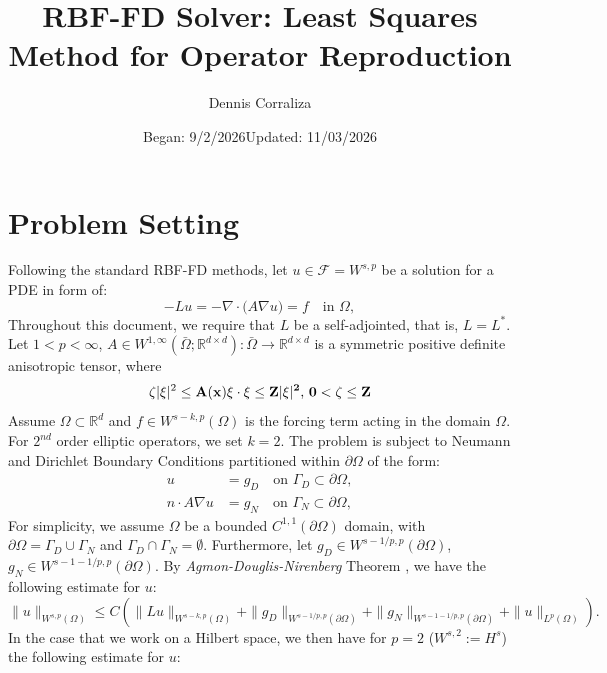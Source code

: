 \documentclass[11pt]{article}
\title{RBF-FD Solver: Least Squares Method for Operator Reproduction}
\author{Dennis Corraliza}
\date{Began: 9/2/2026}
\date{Updated: 11/03/2026}
\newcommand{\diver}{\nabla\!\cdot}
\newcommand{\grad}{\nabla}
\begin{document}
\maketitle

\tableofcontents

\pagebreak

\section{Problem Setting}

Following the standard RBF-FD methods, let $u \in \mathcal{F} = W^{s,p}$ be a solution for a PDE in form of:
\begin{equation}
	- Lu = -\diver\!\big(A \grad u\big) = f \quad \text{in } \Omega,
	\label{eq:PDE}
\end{equation}
Throughout this document, we require that $L$ be a self-adjointed, that is, $L=L^*$. Let $1<p<\infty$, $A \in W^{1,\infty} (\bar{\Omega}; \mathbb{R}^{d \times d}):\bar{\Omega} \rightarrow \mathbb{R}^{d \times d}$ is a symmetric positive definite anisotropic tensor, where
\begin{equation}
	\zeta |\xi|^2 \le \bf{A}(\bf{x}) \xi \cdot \xi \le Z |\xi|^2 \text{, } 0 < \zeta \le Z
\end{equation}
Assume $\Omega \subset \mathbb{R}^d$ and $f \in W^{s-k,p}(\Omega)$ is the forcing term acting in the domain $\Omega$. For $2^{nd}$ order elliptic operators, we set $k=2$. The problem is subject to Neumann and Dirichlet Boundary Conditions partitioned within $\partial \Omega$ of the form:
\begin{align}
  u &= g_D \quad \text{on } \Gamma_D \subset \partial\Omega, \\
  n \cdot A \grad u &= g_N \quad
  \text{on } \Gamma_N \subset \partial\Omega,
  \label{eq:neumann-bc}
\end{align}
For simplicity, we assume $\Omega$ be a bounded $C^{1,1}(\partial \Omega)$ domain, with $\partial \Omega = \Gamma_D \cup \Gamma_N$ and $\Gamma_D \cap \Gamma_N = \emptyset$. Furthermore, let $g_D \in W^{s-1/p,p}(\partial \Omega)$, $g_N \in W^{s-1-1/p,p}(\partial \Omega)$. By \textit{Agmon-Douglis-Nirenberg} Theorem \cite{Agmon}, we have the following estimate for $u$:
\begin{equation}
\|u\|_{W^{s,p}(\Omega)} \leq C\left(\|Lu\|_{W^{s-k,p}(\Omega)} + \|g_D\|_{W^{s-1/p,p}(\partial\Omega)} + \|g_N\|_{W^{s-1-1/p,p}(\partial\Omega)} + \|u\|_{L^p(\Omega)} \right).
\end{equation}
In the case that we work on a Hilbert space, we then have for $p=2$ ($W^{s,2} := H^s$) the following estimate for $u$:
\end{document}
